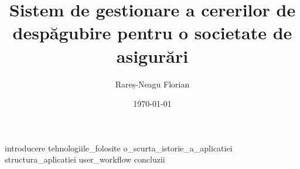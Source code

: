 \documentclass[a4paper]{report}
\title{Sistem de gestionare a cererilor de despăgubire pentru o societate de asigurări}
\author{Rareș-Neagu Florian}
\date{\today}
\begin{document}
\maketitle
\tableofcontents
\newpage
{introducere}
\newpage
{tehnologiile_folosite}
\newpage
{o_scurta_istorie_a_aplicatiei}
\newpage
{structura_aplicatiei}
\newpage
{user_workflow}
\newpage
{concluzii}
\newpage
{}
\printbibliography[title={Bibliografie}]
\end{document}
